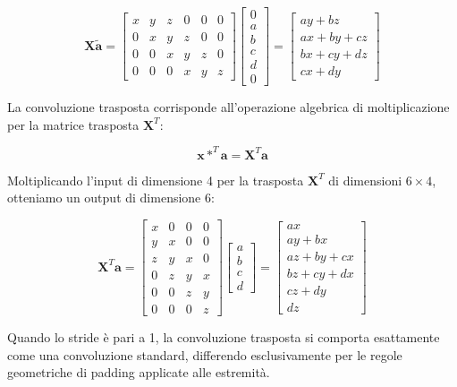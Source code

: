 ﻿\documentclass[11pt, a4paper]{article}
\begin{document}
\[
\bm{X}\tilde{\bm{a}} = \begin{bmatrix}
x & y & z & 0 & 0 & 0 \\
0 & x & y & z & 0 & 0 \\
0 & 0 & x & y & z & 0 \\
0 & 0 & 0 & x & y & z
\end{bmatrix}
\begin{bmatrix}
0 \\ a \\ b \\ c \\ d \\ 0
\end{bmatrix} =
\begin{bmatrix}
ay + bz \\
ax + by + cz \\
bx + cy + dz \\
cx + dy
\end{bmatrix}
\]

La convoluzione trasposta corrisponde all'operazione algebrica di moltiplicazione per la matrice trasposta $\bm{X}^T$:

\[
\bm{x} *^T \bm{a} = \bm{X}^T\bm{a}
\]

Moltiplicando l'input di dimensione 4 per la trasposta $\bm{X}^T$ di dimensioni $6 \times 4$, otteniamo un output di dimensione 6:

\[
\bm{X}^T\bm{a} = \begin{bmatrix}
x & 0 & 0 & 0 \\
y & x & 0 & 0 \\
z & y & x & 0 \\
0 & z & y & x \\
0 & 0 & z & y \\
0 & 0 & 0 & z
\end{bmatrix}
\begin{bmatrix}
a \\ b \\ c \\ d
\end{bmatrix} =
\begin{bmatrix}
ax \\
ay + bx \\
az + by + cx \\
bz + cy + dx \\
cz + dy \\
dz
\end{bmatrix}
\]

Quando lo stride è pari a 1, la convoluzione trasposta si comporta esattamente come una convoluzione standard, differendo esclusivamente per le regole geometriche di padding applicate alle estremità.
\end{document}
